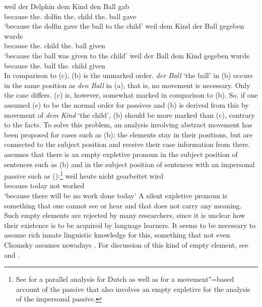 \eal
\label{ex-passive-German-no-movement}
\ex 
\gll weil der Delphin dem Kind den Ball gab\\
     because the.\NOM{} dolfin the.\DAT{} child the.\ACC{} ball gave\\
\glt `because the dolfin gave the ball to the child'
\ex 
\gll weil    dem        Kind  der        Ball gegeben wurde\\
     because the.\DAT{} child the.\NOM{} ball given \AUX\\
\glt `because the ball was given to the child'
\ex 
\gll weil    der        Ball dem        Kind  gegeben wurde\\
     because the.\NOM{} ball the.\DAT{} child given     \AUX\\
\zl
In comparison to (c), (b) is the unmarked order. \emph{der Ball} `the ball' in (b) occurs
in the same position as \emph{den Ball} in (a), that is, no movement is necessary. Only the case differs.
(c) is, however, somewhat marked in comparison to (b). So, if one assumed (c) to
be the normal order for passives and (b) is derived from this by movement of \emph{dem
  Kind} `the child', (b) should be more marked than (c), contrary to the facts. To
solve this problem, an analysis involving abstract movement has been proposed for
cases such as (b): the elements stay in their positions, but are connected to
the subject position and receive their case information from there. \textcites[155--157]{Grewendorf88a}[]{Grewendorf93}
assumes that there is an empty expletive pronoun
in the subject position of sentences such as (b) and in the subject position of sentences with an
impersonal passive such as ():\footnote{%
	See  for a parallel analysis for Dutch as well as 
	 for a movement"=based account of the passive that also involves an
        empty expletive for the analysis of the impersonal passive.
}
\ea
\gll weil    heute nicht gearbeitet wird\\
     because today not   worked     \AUX\\
\glt `because there will be no work done today'
\z
A silent expletive pronoun is something that one cannot see or hear and that does not carry any
meaning. Such empty elements are rejected by many researchers, since it is unclear how their
existence is to be acquired by language learners. It seems to be necessary to assume rich innate
linguistic knowledge for this, something that not even Chomsky assumes nowadays \citep*{HCF2002a}. For discussion of 
this kind of empty element, see  and .

